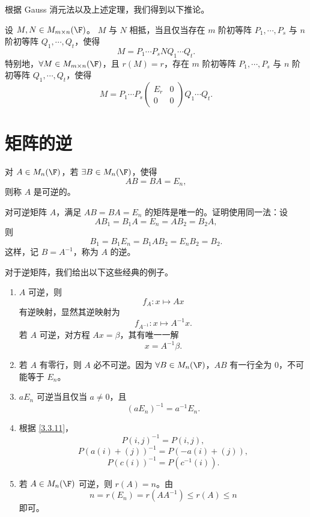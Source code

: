 根据 Gauss 消元法以及上述定理，我们得到以下推论。
\begin{corollary}
	设 $M,N\in M_{m\times n}(\F)$。
	$M$ 与 $N$ 相抵，当且仅当存在 $m$ 阶初等阵 $P_1,\cdots,P_s$ 与 $n$ 阶初等阵 $Q_1,\cdots,Q_t$，使得
	\[
	M=P_1\cdots P_sNQ_1\cdots Q_t.
	\]
	特别地，$\forall M\in M_{m\times n}(\F)$，且 $r(M)=r$，存在 $m$ 阶初等阵 $P_1,\cdots,P_s$ 与 $n$ 阶初等阵 $Q_1,\cdots,Q_t$，使得
	\[
	M=P_1\cdots P_s
	\begin{pmatrix}
		E_r&0\\
		0&0
	\end{pmatrix}
	Q_1\cdots Q_t.
	\]
\end{corollary}

\section{矩阵的逆}

\begin{definition}\label{3.4.1}\label{p1:concept:c3-l1016}
	对 $A\in M_n(\F)$，若 $\exists B\in M_n(\F)$，使得
	\[
	AB=BA=E_n,
	\]
	则称 $A$ 是可逆的。
	
	对可逆矩阵 $A$，满足 $AB=BA=E_n$ 的矩阵是唯一的。证明使用同一法：设
	\[
	AB_1=B_1A=E_n=AB_2=B_2A,
	\]
	则
	\[
	B_1=B_1E_n=B_1AB_2=E_nB_2=B_2.
	\]
	这样，记 $B=A^{-1}$，称为 $A$ 的逆。
\end{definition}

对于逆矩阵，我们给出以下这些经典的例子。
\begin{example}\label{3.4.2}
	\begin{enumerate}
		\item $A$ 可逆，则
		\[
		f_A:x\longmapsto Ax
		\]
		有逆映射，显然其逆映射为
		\[
		f_{A^{-1}}:x\longmapsto A^{-1}x.
		\]
		若 $A$ 可逆，对方程 $Ax=\beta$，其有唯一一解
		\[
		x=A^{-1}\beta.
		\]
		
		\item 若 $A$ 有零行，则 $A$ 必不可逆。因为 $\forall B\in M_n(\F)$，$AB$ 有一行全为 $0$，不可能等于 $E_n$。
		
		\item $aE_n$ 可逆当且仅当 $a\neq0$，且
		\[
		(aE_n)^{-1}=a^{-1}E_n.
		\]
		
		\item 根据 \ref{3.3.11}，
		\[
		P(i,j)^{-1}=P(i,j),
		\]
		\[
		P(a(i)+(j))^{-1}=P(-a(i)+(j)),
		\]
		\[
		P(c(i))^{-1}=P(c^{-1}(i)).
		\]
		
		\item 若 $A\in M_n(\F)$ 可逆，则 $r(A)=n$。由
		\[
		n=r(E_n)=r(AA^{-1})\leq r(A)\leq n
		\]
		即可。
	\end{enumerate}
\end{example}


